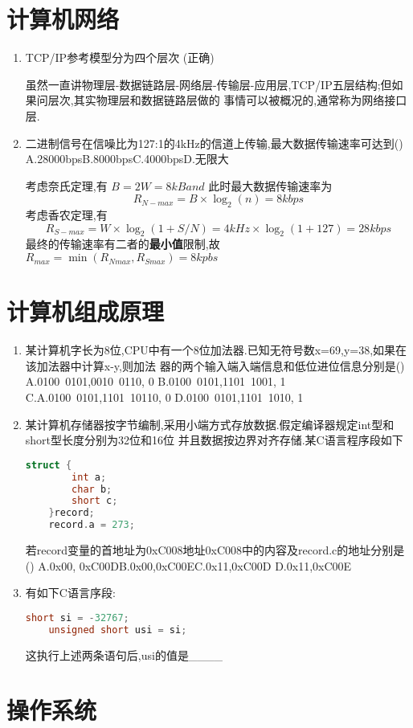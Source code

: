 \documentclass[12pt, a4paper, oneside, UTF8]{ctexbook}
\begin{document}
\section{计算机网络}
\begin{enumerate}
    \item TCP/IP参考模型分为四个层次 (正确) 
    \begin{solution}
        虽然一直讲物理层-数据链路层-网络层-传输层-应用层,TCP/IP五层结构;但如果问层次,其实物理层和数据链路层做的
        事情可以被概况的,通常称为网络接口层.
    \end{solution}
    \item 二进制信号在信噪比为127:1的4kHz的信道上传输,最大数据传输速率可达到() \\
    A.28000bps\qquad B.8000bps\qquad C.4000bps\qquad D.无限大
    \begin{solution}
        考虑奈氏定理,有 $B=2W=8kBand$ 此时最大数据传输速率为 $$R_{N-max}= B\times\log_{2}(n)=8kbps$$ 
        考虑香农定理,有 $$R_{S-max}=W\times\log_{2}(1+S/N)=4kHz\times\log_{2}(1+127)=28kbps$$ 
        最终的传输速率有二者的{\textbf{最小值}}限制,故$R_{max}=\min{(R_{Nmax},R_{Smax})}=8kpbs$
    \end{solution}
\end{enumerate}

\section{计算机组成原理}

\begin{enumerate}
    \item 某计算机字长为8位,CPU中有一个8位加法器.已知无符号数x=69,y=38,如果在该加法器中计算x-y,则加法
    器的两个输入端入端信息和低位进位信息分别是() \\
    A.0100\ 0101,0010\ 0110, 0 \qquad B.0100\ 0101,1101\ 1001, 1 \\
    C.A.0100\ 0101,1101\ 10110, 0 \qquad D.0100\ 0101,1101\ 1010, 1
    \item 某计算机存储器按字节编制,采用小端方式存放数据.假定编译器规定int型和short型长度分别为32位和16位
    并且数据按边界对齐存储.某C语言程序段如下
\begin{lstlisting}[language=C]
    struct {
        int a;
        char b;
        short c;
    }record;
    record.a = 273;
\end{lstlisting}
    若record变量的首地址为0xC008地址0xC008中的内容及record.c的地址分别是()
    A.0x00, 0xC00D\qquad B.0x00,0xC00E\qquad C.0x11,0xC00D \qquad D.0x11,0xC00E 

    \item 有如下C语言序段:
\begin{lstlisting}[language=C]
    short si = -32767;
    unsigned short usi = si;
\end{lstlisting}
    这执行上述两条语句后,usi的值是\_\_\_\_ 
\end{enumerate}
\section{操作系统}
\ifx\allfiles\undefined
\end{document}
